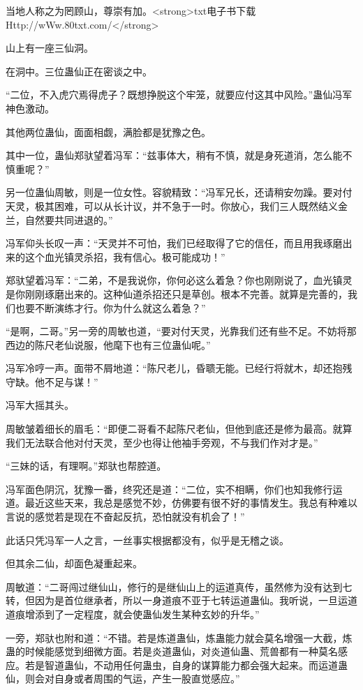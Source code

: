 \begin{this_body}
当地人称之为罔顾山，尊崇有加。<strong>txt电子书下载Http://wWw.80txt.com/</strong>

山上有一座三仙洞。

在洞中。三位蛊仙正在密谈之中。

“二位，不入虎穴焉得虎子？既想挣脱这个牢笼，就要应付这其中风险。”蛊仙冯军神色激动。

其他两位蛊仙，面面相觑，满脸都是犹豫之色。

其中一位，蛊仙郑驮望着冯军：“兹事体大，稍有不慎，就是身死道消，怎么能不慎重呢？”

另一位蛊仙周敏，则是一位女性。容貌精致：“冯军兄长，还请稍安勿躁。要对付天灵，极其困难，可以从长计议，并不急于一时。你放心，我们三人既然结义金兰，自然要共同进退的。”

冯军仰头长叹一声：“天灵并不可怕，我们已经取得了它的信任，而且用我琢磨出来的这个血光镇灵杀招，我有信心。极可能成功！”

郑驮望着冯军：“二弟，不是我说你，你何必这么着急？你也刚刚说了，血光镇灵是你刚刚琢磨出来的。这种仙道杀招还只是草创。根本不完善。就算是完善的，我们也要不断演练才行。你为什么就这么着急？”

“是啊，二哥。”另一旁的周敏也道，“要对付天灵，光靠我们还有些不足。不妨将那西边的陈尺老仙说服，他麾下也有三位蛊仙呢。”

冯军冷哼一声。面带不屑地道：“陈尺老儿，昏聩无能。已经行将就木，却还抱残守缺。他不足与谋！”

冯军大摇其头。

周敏皱着细长的眉毛：“即便二哥看不起陈尺老仙，但他到底还是修为最高。就算我们无法联合他对付天灵，至少也得让他袖手旁观，不与我们作对才是。”

“三妹的话，有理啊。”郑驮也帮腔道。

冯军面色阴沉，犹豫一番，终究还是道：“二位，实不相瞒，你们也知我修行运道。最近这些天来，我总是感觉不妙，仿佛要有很不好的事情发生。我总有种难以言说的感觉若是现在不奋起反抗，恐怕就没有机会了！”

此话只凭冯军一人之言，一丝事实根据都没有，似乎是无稽之谈。

但其余二仙，却面色凝重起来。

周敏道：“二哥闯过继仙山，修行的是继仙山上的运道真传，虽然修为没有达到七转，但因为是首位继承者，所以一身道痕不亚于七转运道蛊仙。我听说，一旦运道道痕增添到了一定程度，就会使蛊仙发生某种玄妙的升华。”

一旁，郑驮也附和道：“不错。若是炼道蛊仙，炼蛊能力就会莫名增强一大截，炼蛊的时候能感觉到细微方面。若是炎道蛊仙，对炎道仙蛊、荒兽都有一种莫名感应。若是智道蛊仙，不动用任何蛊虫，自身的谋算能力都会强大起来。而运道蛊仙，则会对自身或者周围的气运，产生一股直觉感应。”


\end{this_body}

